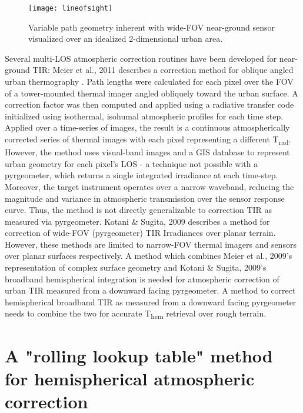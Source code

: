 \begin{figure}[!ht]
	\texttt{[image: lineofsight]}
	\label{lineofsight}
	\caption{Variable path geometry inherent with wide-FOV near-ground sensor visualized over an idealized 2-dimensional urban area.}
\end{figure}

Several multi-LOS atmospheric correction routines have been developed for near-ground TIR: Meier et al., 2011 describes a correction method for oblique angled urban thermography \cite{Meier2011}. Path lengths were calculated for each pixel over the FOV of a tower-mounted thermal imager angled obliquely toward the urban surface. A correction factor was then computed and applied using a radiative transfer code initialized using isothermal, isohumal atmospheric profiles for each time step. Applied over a time-series of images, the result is a continuous atmospherically corrected series of thermal images with each pixel representing a different T\textsubscript{rad}. However, the method uses visual-band images and a GIS database to represent urban geometry for each pixel's LOS - a technique not possible with a pyrgeometer, which returns a single integrated irradiance at each time-step. Moreover, the target instrument operates over a narrow waveband, reducing the magnitude and variance in atmospheric transmission over the sensor response curve. Thus, the method is not directly generalizable to correction TIR as measured via pyrgeometer.  Kotani \& Sugita, 2009 describes a method for correction of wide-FOV (pyrgeometer) TIR Irradiances \cite{Kotani2009a} over planar terrain. However, these methods are limited to narrow-FOV thermal imagers and sensors over planar surfaces respectively. A method which combines Meier et al., 2009's representation of complex surface geometry and Kotani \& Sugita, 2009's broadband hemispherical integration is needed for atmospheric correction of urban TIR measured from a downward facing pyrgeometer. A method to correct hemispherical broadband TIR as measured from a downward facing pyrgeometer needs to combine the two for accurate T\textsubscript{hem} retrieval over rough terrain. 

\section{A "rolling lookup table" method for hemispherical atmospheric correction}


